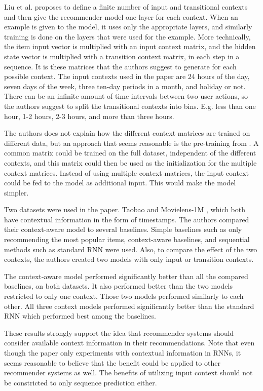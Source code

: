 Liu et al. proposes to define a finite number of input and transitional contexts and then give the recommender model one layer for each context. When an example is given to the model, it uses only the appropriate layers, and similarly training is done on the layers that were used for the example. More technically, the item input vector is multiplied with an input context matrix, and the hidden state vector is multiplied with a transition context matrix, in each step in a sequence. It is these matrices that the authors suggest to generate for each possible context. The input contexts used in the paper are 24 hours of the day, seven days of the week, three ten-day periods in a month, and holiday or not. There can be an infinite amount of time intervals between two user actions, so the authors suggest to split the transitional contexts into bins. E.g. less than one hour, 1-2 hours, 2-3 hours, and more than three hours.

The authors does not explain how the different context matrices are trained on different data, but an approach that seems reasonable is the pre-training from \cite{DBLP:journals/corr/TanXL16}. A common matrix could be trained on the full dataset, independent of the different contexts, and this matrix could then be used as the initialization for the multiple context matrices. Instead of using multiple context matrices, the input context could be fed to the model as additional input. This would make the model simpler.

Two datasets were used in the paper. Taobao \cite{dataset:taobao} and Movielens-1M \cite{dataset:movielens}, which both have contextual information in the form of timestamps. The authors compared their context-aware model to several baselines. Simple baselines such as only recommending the most popular items, context-aware baselines, and sequential methods such as standard RNN were used. Also, to compare the effect of the two contexts, the authors created two models with only input or transition contexts.

The context-aware model performed significantly better than all the compared baselines, on both datasets. It also performed better than the two models restricted to only one context. Those two models performed similarly to each other. All three context models performed significantly better than the standard RNN which performed best among the baselines.

These results strongly support the idea that recommender systems should consider available context information in their recommendations. Note that even though the paper only experiments with contextual information in RNNs, it seems reasonable to believe that the benefit could be applied to other recommender systems as well. The benefits of utilizing input context should not be constricted to only sequence prediction either.



